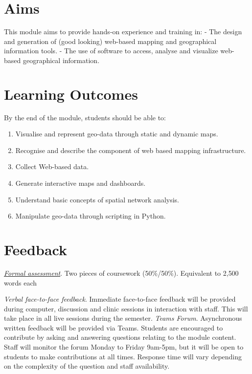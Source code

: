 \documentclass[
  letterpaper,
  DIV=11,
  numbers=noendperiod]{scrreprt}
\providecommand{\tightlist}{%
  \setlength{\itemsep}{0pt}\setlength{\parskip}{0pt}}\usepackage{longtable,booktabs,array}
\begin{document}
\section*{Aims}\label{aims}


This module aims to provide hands-on experience and training in: - The
design and generation of (good looking) web-based mapping and
geographical information tools. - The use of software to access, analyse
and visualize web-based geographical information.

\section*{Learning Outcomes}\label{learning-outcomes}


By the end of the module, students should be able to:

\begin{enumerate}
\def\labelenumi{(\arabic{enumi})}
\setcounter{enumi}{1}
\tightlist
\item
  Visualise and represent geo-data through static and dynamic maps.
\item
  Recognise and describe the component of web based mapping
  infrastructure.
\item
  Collect Web-based data.
\item
  Generate interactive maps and dashboards.
\item
  Understand basic concepts of spatial network analysis.
\item
  Manipulate geo-data through scripting in Python.
\end{enumerate}

\section*{Feedback}\label{feedback}


\href{https://gdsl-ul.github.io/wma/assess.html}{\emph{Formal
assessment}}. Two pieces of coursework (50\%/50\%). Equivalent to 2,500
words each

\emph{Verbal face-to-face feedback}. Immediate face-to-face feedback
will be provided during computer, discussion and clinic sessions in
interaction with staff. This will take place in all live sessions during
the semester. \emph{Teams Forum}. Asynchronous written feedback will be
provided via Teams. Students are encouraged to contribute by asking and
answering questions relating to the module content. Staff will monitor
the forum Monday to Friday 9am-5pm, but it will be open to students to
make contributions at all times. Response time will vary depending on
the complexity of the question and staff availability.
\end{document}
